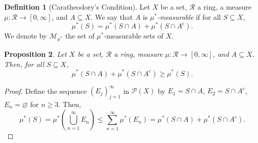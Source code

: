 \documentclass[a4paper, openany]{memoir}
\theoremstyle{definition}
\newtheorem{definition}{Definition}[section]
\theoremstyle{plain}
\newtheorem{proposition}[definition]{Proposition}
\begin{document}
    \begin{definition}[Caratheodory's Condition]
        Let $X$ be a set, $\mathcal{R}$ a ring, a measure $\mu \colon \mathcal{R} \to [0, \infty]$, and $A \subseteq X$. We say that $A$ is \emph{$\mu^*$-measurable} if for all $S \subseteq X$,
        \[\mu^*(S) = \mu^*(S \cap A) + \mu^*(S \cap A^c).\]
        We denote by $\mathcal{M}_{\mu^*}$ the set of $\mu^*$-measurable sets of $X$.
    \end{definition}

    \begin{proposition}
        Let $X$ be a set, $\mathcal{R}$ a ring, measure $\mu \colon \mathcal{R} \to [0, \infty]$, and $A \subseteq X$. Then, for all $S \subseteq X$, 
        \[\mu^*(S \cap A) + \mu^*(S \cap A^c) \geq \mu^*(S).\]
    \end{proposition}
    \begin{proof}
        Define the sequence $(E_j)_{j=1}^\infty$ in $\mathcal{P}(X)$ by $E_1 = S \cap A$, $E_2 = S \cap A^c$, $E_n = \varnothing$ for $n \geq 3$. Then,
        \[\mu^*(S) = \mu^* \left(\bigcup_{n=1}^\infty E_n\right) \leq \sum_{n=1}^\infty \mu^*(E_n) = \mu^*(S \cap A) + \mu^*(S \cap A^c).\]
    \end{proof}
\end{document}
